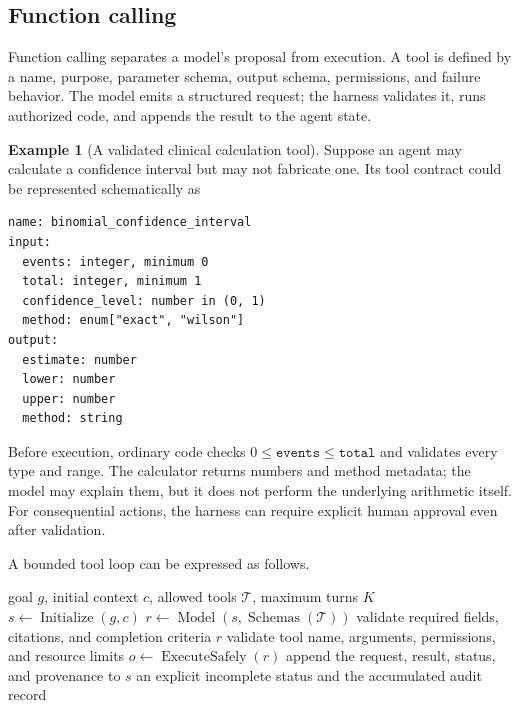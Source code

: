 \documentclass[12pt,oneside]{book}
\numberwithin{equation}{section}
\theoremstyle{definition}
\newtheorem{example}{Example}[section]
\theoremstyle{plain}
\theoremstyle{remark}
\begin{document}
\subsection{Function calling}

Function calling separates a model's proposal from execution.  A tool is
defined by a name, purpose, parameter schema, output schema, permissions, and
failure behavior.  The model emits a structured request; the harness validates
it, runs authorized code, and appends the result to the agent state.

\begin{example}[A validated clinical calculation tool]
Suppose an agent may calculate a confidence interval but may not fabricate one.
Its tool contract could be represented schematically as
\begin{lstlisting}[language={},numbers=none]
name: binomial_confidence_interval
input:
  events: integer, minimum 0
  total: integer, minimum 1
  confidence_level: number in (0, 1)
  method: enum["exact", "wilson"]
output:
  estimate: number
  lower: number
  upper: number
  method: string
\end{lstlisting}
Before execution, ordinary code checks $0\leq\texttt{events}\leq
\texttt{total}$ and validates every type and range.  The calculator returns
numbers and method metadata; the model may explain them, but it does not perform
the underlying arithmetic itself.  For consequential actions, the harness can
require explicit human approval even after validation.
\end{example}

A bounded tool loop can be expressed as follows.
\begin{algorithm}[H]
\caption{Validated agent loop}
\begin{algorithmic}[1]
\Require goal $g$, initial context $c$, allowed tools $\mathcal T$, maximum turns $K$
\State $s\gets\operatorname{Initialize}(g,c)$
    \State $r\gets\operatorname{Model}(s,\operatorname{Schemas}(\mathcal T))$
        \State validate required fields, citations, and completion criteria
         \State \Return $r$ \EndIf
    \Else
        \State validate tool name, arguments, permissions, and resource limits
        \State $o\gets\operatorname{ExecuteSafely}(r)$
        \State append the request, result, status, and provenance to $s$
    \EndIf
\EndFor
\State \Return an explicit incomplete status and the accumulated audit record
\end{algorithmic}
\end{algorithm}
\end{document}

